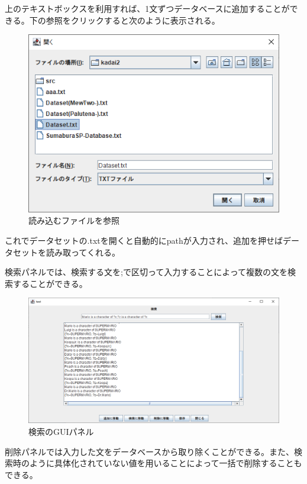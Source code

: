 \documentclass{jarticle}
\begin{document}
上のテキストボックスを利用すれば、1文ずつデータベースに追加することができる。下の参照をクリックすると次のように表示される。

\begin{figure}[!hbt]
  \centering
  \includegraphics[bb=0 0 505 358,width=1\linewidth]{pic2.png}
  \caption{読み込むファイルを参照}
  \label{fig:pic2}
\end{figure}

これでデータセットの.txtを開くと自動的にpathが入力され、追加を押せばデータセットを読み取ってくれる。

検索パネルでは、検索する文を;で区切って入力することによって複数の文を検索することができる。

\begin{figure}[!hbt]
  \centering
  \includegraphics[bb=0 0 986 493,width=1.2\linewidth]{pic4.png}
  \caption{検索のGUIパネル}
  \label{fig:pic4}
\end{figure}

削除パネルでは入力した文をデータベースから取り除くことができる。また、検索時のように具体化されていない値を用いることによって一括で削除することもできる。
\end{document}
